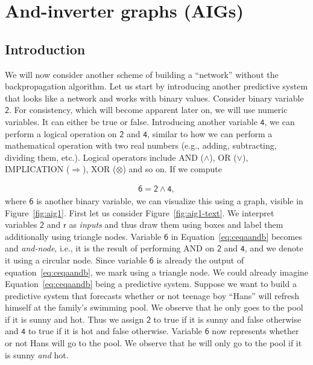 \section{And-inverter graphs (AIGs)}

\subsection{Introduction}
We will now consider another scheme of building a \enquote{network} without the backpropagation algorithm. Let us start by introducing another predictive system that looks like a network and works with binary values. Consider binary variable $\mathsf{2}$. For consistency, which will become apparent later on, we will use numeric variables. It can either be true or false. Introducing another variable $\mathsf{4}$, we can perform a logical operation on $\mathsf{2}$ and $\mathsf{4}$, similar to how we can perform a mathematical operation with two real numbers (e.g., adding, subtracting, dividing them, etc.). Logical operators include AND ($\wedge$), OR ($\vee$), IMPLICATION ($\Rightarrow$), XOR ($\otimes$) and so on. If we compute

\begin{align} \label{eq:ceqaandb}
    \mathsf{6} = \mathsf{2} \wedge \mathsf{4},
  \end{align}where $\mathsf{6}$ is another binary variable, we can visualize this using a graph, visible in Figure~\ref{fig:aig1}. First let us consider Figure~\ref{fig:aig1-text}. We interpret variables $\mathsf{2}$ and $\mathsf{r}$ as \textit{inputs} and thus draw them using boxes and label them additionally using triangle nodes. Variable $\mathsf{6}$ in Equation~\ref{eq:ceqaandb} becomes and \textit{and-node}, i.e., it is the result of performing AND on $\mathsf{2}$ and $\mathsf{4}$, and we denote it using a circular node. Since variable $\mathsf{6}$ is already the output of equation~\ref{eq:ceqaandb}, we mark using a triangle node. We could already imagine Equation~\ref{eq:ceqaandb} being a predictive system. Suppose we want to build a predictive system that forecasts whether or not teenage boy \enquote{Hans} will refresh himself at the family's swimming pool. We observe that he only goes to the pool if it is sunny and hot. Thus we assign $\mathsf{2}$ to true if it is sunny and false otherwise and $\mathsf{4}$ to true if it is hot and false otherwise. Variable $\mathsf{6}$ now represents whether or not Hans will go to the pool. We observe that he will only go to the pool if it is sunny \textit{and} hot.

